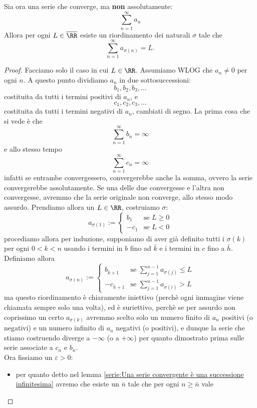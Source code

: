 \documentclass[11pt]{scrartcl}
\begin{document}
	\begin{theorem}[Riemann]
		Sia ora una serie che converge, ma \textbf{non} assolutamente:
		$$\sum_{n=1}^{\infty}a_n$$
		Allora per ogni $L\in\overline{\RR}$ esiste un riordinamento dei naturali $\sigma$ tale che 
		$$\sum_{n=1}^{\infty}a_{\sigma(n)}=L.$$
	\end{theorem}
	\begin{proof}
		Facciamo solo il caso in cui $L\in\RR$. Assumiamo WLOG che $a_n\ne 0$ per ogni $n$. A questo punto dividiamo $a_n$ in due sottosuccessioni:
		$$b_1,b_2,b_3,\dots$$
		costituita da tutti i termini positivi di $a_n$, e 
		$$c_1,c_2,c_3,\dots$$
		costituita da tutti i termini negativi di $a_n$, cambiati di segno. La prima cosa che si vede è che 
		$$\sum_{n=1}^\infty b_n = \infty$$
		e allo stesso tempo 
		$$\sum_{n=1}^\infty c_n = \infty$$
		infatti se entrambe convergessero, convergerebbe anche la somma, ovvero la serie convergerebbe assolutamente. Se una delle due convergesse e l'altra non convergesse, avremmo che la serie originale non converge, allo stesso modo assurdo. Prendiamo allora un $L\in\RR$, costruiamo $\sigma$:
		$$a_{\sigma(1)}:=
		\begin{cases}
			b_1 & \text{se $L\ge 0$} \\
			-c_1 & \text{se $L<0$}
		\end{cases}$$
		procediamo allora per induzione, supponiamo di aver già definito tutti i $\sigma(k)$ per ogni $0<k< n$ usando i termini in $b$ fino ad $\bar{k}$ e i termini in $c$ fino a $\bar{h}$. Definiamo allora
		$$a_{\sigma(n)}:=
		\begin{cases}
			b_{\bar{k}+1} & \text{se } \sum_{j=1}^{n-1}a_{\sigma(j)}\le L \\
			-c_{\bar{h}+1} & \text{se } \sum_{j=1}^{n-1}a_{\sigma(i)}>L
		\end{cases}$$
		ma questo riordinamento è chiaramente iniettivo (perchè ogni immagine viene chiamata sempre solo una volta), ed è suriettivo, perchè se per assurdo non coprissimo un certo $a_{\sigma(k)}$ avremmo scelto solo un numero finito di $a_n$ positivi (o negativi) e un numero infinito di $a_n$ negativi (o positivi), e dunque la serie che stiamo costruendo diverge a $-\infty$ (o a $+\infty$) per quanto dimostrato prima sulle serie associate a $c_n$ e $b_n$. \\
		Ora fissiamo un $\varepsilon>0$:
		\begin{itemize}
			\item per quanto detto nel lemma \ref{serie:Una serie convergente è una successione infinitesima} avremo che esiste un $\bar{n}$ tale che per ogni $n\ge \bar{n}$ vale

\end{itemize}
\end{proof}
\end{document}
